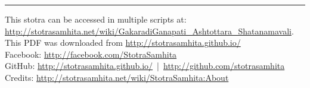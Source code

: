 \documentclass[a5paper,twoside,12pt]{book}
\begin{document}
\setmainfont[Script=Devanagari,Mapping=tex-text]{Sanskrit 2003}
\fontsize {16}{19.25}\selectfont

\vfill
\hrule
\footnotesize
{}
\noindent\textsf{This stotra can be accessed in multiple scripts at:\\
\url{http://stotrasamhita.net/wiki/GakaradiGanapati_Ashtottara_Shatanamavali}. This PDF was downloaded from \url{http://stotrasamhita.github.io/}\\[1ex]
Facebook: \url{http://facebook.com/StotraSamhita}\\[0.7ex]
GitHub: \url{http://stotrasamhita.github.io/}~|~\url{http://github.com/stotrasamhita}\\[0.7ex]
Credits: \url{http://stotrasamhita.net/wiki/StotraSamhita:About}}
\end{document}
